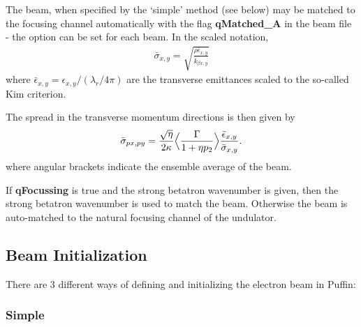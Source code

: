 \documentclass[12pt]{article}%
\begin{document}
The beam, when specified by the `simple' method (see below) may be matched to the focusing channel automatically with the flag {\bf qMatched\_A} in the beam file - the option can be set for each beam. In the scaled notation,
\begin{align}
\bar{\sigma}_{x,y} = \sqrt{  \frac{ \rho \bar{\epsilon}_{x,y} }{\bar{k}_{\beta x,y} }  }
\end{align}
where $\bar{\epsilon}_{x,y} = \epsilon_{x,y} / (\lambda_r / 4\pi)$ are the transverse emittances scaled to the so-called Kim criterion.



The spread in the transverse momentum directions is then given by 
\begin{align}
\bar{\sigma}_{px, py} = \frac{\sqrt{\eta}}{2 \kappa} \Bigl<  \frac{\Gamma}{1+\eta p_{2}}  \Bigr> \frac{ \bar{\epsilon}_{x,y} }{\bar{ \sigma}_{x,y}}.   \label{tmtch_spd} 
\end{align}
where angular brackets indicate the ensemble average of the beam.

If {\bf qFocussing} is true and the strong betatron wavenumber is given, then the strong betatron wavenumber is used to match the beam. Otherwise the beam is auto-matched to the natural focusing channel of the undulator. 

















\subsection{Beam Initialization}
\label{beamfls}
There are 3 different ways of defining and initializing the electron beam in Puffin:

\subsubsection{Simple}
\end{document}
